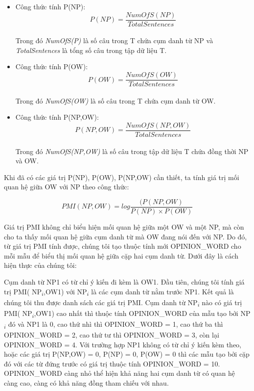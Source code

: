 \documentclass[12pt]{report}
\begin{document}
					\begin{itemize}
						\item{Công thức tính P(NP):
							\begin{equation*}
							P(NP) = \frac{NumOfS(NP)}{TotalSentences}
							\end{equation*}
						\\Trong đó \textit{NumOfS(P)} là số câu trong T chứa cụm danh từ NP và \textit{TotalSentences} là tổng số câu trong tập dữ liệu T.}
						\item{Công thức tính P(OW):
							\begin{equation*}
							P(OW) = \frac{NumOfS(OW)}{TotalSentences}
							\end{equation*}
						\\Trong đó \textit{NumOfS(OW)} là số câu trong T chứa cụm danh từ OW.}
						\item{Công thức tính P(NP,OW):
							\begin{equation*}
							P(NP,OW) = \frac{NumOfS(NP,OW)}{TotalSentences}
							\end{equation*}
						\\Trong đó \textit{NumOfS(NP,OW)} là số câu trong tập dữ liệu T chứa đồng thời NP và OW.}
					\end{itemize}
					\par Khi đã có các giá trị P(NP), P(OW), P(NP,OW) cần thiết, ta tính giá trị mối quan hệ giữa OW với NP theo công thức:
					\begin{center}
						\begin{equation*}
						PMI(NP,OW) = log\frac{(P(NP,OW)}{P(NP)\times P(OW)}
						\end{equation*}
					\end{center}
					\par Giá trị PMI không chỉ biểu hiện mối quan hệ giữa một OW và một NP, mà còn cho ta thấy mối quan hệ giữa cụm danh từ mà OW đang nói đến với NP. Do đó, từ giá trị PMI tính được, chúng tôi tạo thuộc tính mới OPINION\_WORD cho mỗi mẫu để biểu thị mối quan hệ giữa cặp hai cụm danh từ. Dưới đây là cách hiện thực của chúng tôi: 
					\par Cụm danh từ NP1 có từ chỉ ý kiến đi kèm là OW1. Đầu tiên, chúng tôi tính giá trị PMI( NP\textsubscript{$i$},OW1) với  NP\textsubscript{$i$} là các cụm danh từ nằm trước NP1. Kết quả là chúng tôi thu được danh sách các giá trị PMI. Cụm danh từ  NP\textsubscript{$i$} nào có giá trị PMI( NP\textsubscript{$i$},OW1) cao nhất thì thuộc tính OPINION\_WORD của mẫu tạo bởi  NP\textsubscript{$i$} đó và NP1 là 0, cao thứ nhì thì OPINION\_WORD = 1, cao thứ ba thì OPINION\_WORD = 2, cao thứ tư thì OPINION\_WORD = 3, còn lại OPINION\_WORD = 4. Với trường hợp NP1 không có từ chỉ ý kiến kèm theo, hoặc các giá trị P(NP,OW) = 0, P(NP) = 0, P(OW) = 0 thì  các mẫu tạo bởi cặp đó với các từ đứng trước có giá trị thuộc tính OPINION\_WORD = 10. OPINION\_WORD càng nhỏ thể hiện khả năng hai cụm danh từ có quan hệ càng cao, càng có khả năng đồng tham chiếu với nhau.
\end{document}
